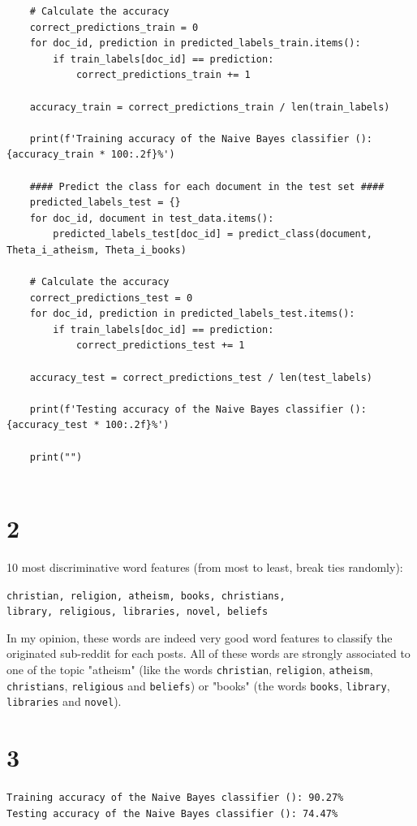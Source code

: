 \documentclass[12pt]{article}
\begin{document}
\begin{enumerate}
\begin{lstlisting}
    # Calculate the accuracy
    correct_predictions_train = 0
    for doc_id, prediction in predicted_labels_train.items():
        if train_labels[doc_id] == prediction:
            correct_predictions_train += 1
            
    accuracy_train = correct_predictions_train / len(train_labels)

    print(f'Training accuracy of the Naive Bayes classifier (): {accuracy_train * 100:.2f}%')
    
    #### Predict the class for each document in the test set ####
    predicted_labels_test = {}
    for doc_id, document in test_data.items():
        predicted_labels_test[doc_id] = predict_class(document, Theta_i_atheism, Theta_i_books)

    # Calculate the accuracy
    correct_predictions_test = 0
    for doc_id, prediction in predicted_labels_test.items():
        if train_labels[doc_id] == prediction:
            correct_predictions_test += 1
            
    accuracy_test = correct_predictions_test / len(test_labels)

    print(f'Testing accuracy of the Naive Bayes classifier (): {accuracy_test * 100:.2f}%')
    
    print("")
    
\end{lstlisting}

\part{2} 10 most discriminative word features (from most to least, break ties randomly):

\texttt{christian, religion, atheism, books, christians, \\library, religious, libraries, novel, beliefs}

In my opinion, these words are indeed very good word features to classify the originated sub-reddit for each posts. All of these words are strongly associated to one of the topic "atheism" (like the words \texttt{christian}, \texttt{religion}, \texttt{atheism}, \texttt{christians}, \texttt{religious} and \texttt{beliefs}) or "books" (the words \texttt{books}, \texttt{library}, \texttt{libraries} and \texttt{novel}).

\part{3} 
\texttt{Training accuracy of the Naive Bayes classifier (): 90.27\%\\
Testing accuracy of the Naive Bayes classifier (): 74.47\%}


\end{enumerate}
\end{document}
